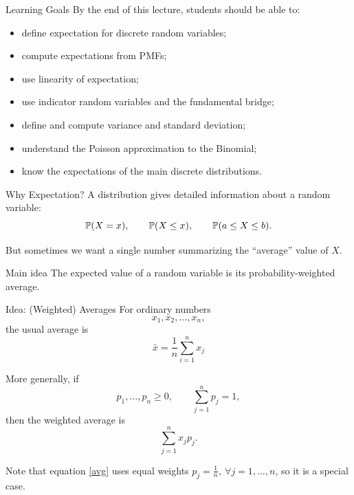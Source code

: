 \setcounter{framenumber}{0}

\begin{frame}
  \titlepage
\end{frame}

\begin{frame}{Learning Goals}
By the end of this lecture, students should be able to:
\begin{itemize}
    \item define expectation for discrete random variables;
    \item compute expectations from PMFs;
    \item use linearity of expectation;
    \item use indicator random variables and the fundamental bridge;
    \item define and compute variance and standard deviation;
    \item understand the Poisson approximation to the Binomial;
    \item know the expectations of the main discrete distributions.
\end{itemize}
\end{frame}


\begin{frame}{Why Expectation?}
A distribution gives detailed information about a random variable:
\[
\mathbb{P}(X=x), \qquad \mathbb{P}(X\leq x), \qquad \mathbb{P}(a\leq X\leq b).
\]

\vspace{0.25cm}

But sometimes we want a single number summarizing the ``average'' value of $X$.

\vspace{0.25cm}

\begin{keybox}{Main idea}
The expected value of a random variable is its probability-weighted average.
\end{keybox}
\end{frame}

\begin{frame}{Idea: (Weighted) Averages}
For ordinary numbers
\[
x_1,x_2,\dots,x_n,
\]
the usual average is
\begin{equation} \label{avg}
    \bar x = \frac{1}{n} \sum_{i=1}^n x_j 
\end{equation}

More generally, if
\[
p_1,\dots,p_n\geq0,
\qquad
\sum_{j=1}^n p_j=1,
\]
then the weighted average is
\[
\sum_{j=1}^n x_jp_j.
\]

Note that equation \eqref{avg} uses equal weights $p_j= \frac{1}{n}, \ \forall j=1,\dots, n$, so it is a special case.
 


\end{frame}

